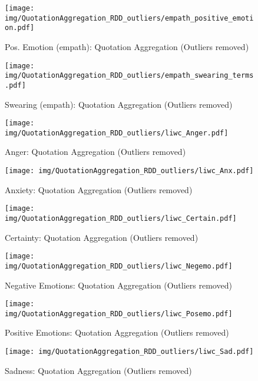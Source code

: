\begin{figure}[h]\centering
\texttt{[image: img/QuotationAggregation\_RDD\_outliers/empath\_positive\_emotion.pdf]}
\caption{Pos. Emotion (empath): Quotation Aggregation (Outliers removed)}
\label{fig: qa_Pos. Emotion (empath)}
\end{figure}

\begin{figure}[h]\centering
\texttt{[image: img/QuotationAggregation\_RDD\_outliers/empath\_swearing\_terms.pdf]}
\caption{Swearing (empath): Quotation Aggregation (Outliers removed)}
\label{fig: qa_Swearing (empath)}
\end{figure}

\begin{figure}[h]\centering
\texttt{[image: img/QuotationAggregation\_RDD\_outliers/liwc\_Anger.pdf]}
\caption{Anger: Quotation Aggregation (Outliers removed)}
\label{fig: qa_Anger}
\end{figure}

\begin{figure}[h]\centering
\texttt{[image: img/QuotationAggregation\_RDD\_outliers/liwc\_Anx.pdf]}
\caption{Anxiety: Quotation Aggregation (Outliers removed)}
\label{fig: qa_Anxiety}
\end{figure}

\begin{figure}[h]\centering
\texttt{[image: img/QuotationAggregation\_RDD\_outliers/liwc\_Certain.pdf]}
\caption{Certainty: Quotation Aggregation (Outliers removed)}
\label{fig: qa_Certainty}
\end{figure}

\begin{figure}[h]\centering
\texttt{[image: img/QuotationAggregation\_RDD\_outliers/liwc\_Negemo.pdf]}
\caption{Negative Emotions: Quotation Aggregation (Outliers removed)}
\label{fig: qa_Negative Emotions}
\end{figure}

\begin{figure}[h]\centering
\texttt{[image: img/QuotationAggregation\_RDD\_outliers/liwc\_Posemo.pdf]}
\caption{Positive Emotions: Quotation Aggregation (Outliers removed)}
\label{fig: qa_Positive Emotions}
\end{figure}

\begin{figure}[h]\centering
\texttt{[image: img/QuotationAggregation\_RDD\_outliers/liwc\_Sad.pdf]}
\caption{Sadness: Quotation Aggregation (Outliers removed)}
\label{fig: qa_Sadness}
\end{figure}

